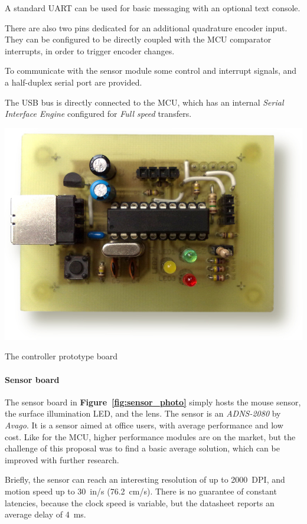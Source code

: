 \documentclass[a4paper,10pt]{article}
\makeatletter
\newenvironment{figurehere}{\def\@captype{figure}\vspace{2ex}}{\vspace{2ex}}
\newcommand{\citef}[1]{\textbf{Figure~\ref{#1}}}
\makeatother
\begin{document}
\begin{multicols}{2}
A standard UART can be used for basic messaging with an optional text console.

There are also two pins dedicated for an additional quadrature encoder input.
They can be configured to be directly coupled with the MCU comparator
interrupts, in order to trigger encoder changes.

To communicate with the sensor module some control and interrupt signals, and
a half-duplex serial port are provided.

The USB bus is directly connected to the MCU, which has an internal
\emph{Serial Interface Engine} configured for \emph{Full speed} transfers.

\begin{figurehere}
	\centering
	\includegraphics[keepaspectratio=true,width=\columnwidth]{images/board_photo.jpg}
	\caption{The controller prototype board}
	\label{fig:board_photo}
\end{figurehere}


\paragraph{Sensor board}
The sensor board in \citef{fig:sensor_photo} simply hosts the mouse sensor,
the surface illumination LED, and the lens. The sensor is an \emph{ADNS-2080}
\cite{avago_adns2080} by \emph{Avago}. It is a sensor aimed at office users,
with average performance and low cost. Like for the MCU, higher performance
modules are on the market, but the challenge of this proposal was to find a
basic average solution, which can be improved with further research.

Briefly, the sensor can reach an interesting resolution of up to 2000~DPI, and
motion speed up to 30~in/s (76.2~cm/s). There is no guarantee of constant
latencies, because the clock speed is variable, but the datasheet reports an
average delay of 4~ms.


\end{multicols}
\end{document}
